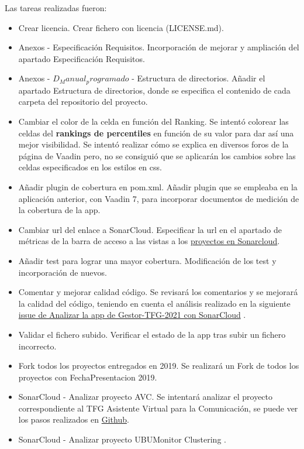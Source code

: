 Las tareas realizadas fueron:
\begin{itemize}
	\tightlist
	\item Crear licencia.
		Crear fichero con licencia (LICENSE.md).
	\item Anexos - Especificación Requisitos.
		Incorporación de mejorar y ampliación del apartado Especificación Requisitos.
	\item Anexos - $D_Manual_programado$ - Estructura de directorios.
		Añadir el apartado Estructura de directorios, donde se especifica el contenido de cada carpeta del repositorio del proyecto.
	\item Cambiar el color de la celda en función del Ranking.
		Se intentó colorear las celdas del \textbf{rankings de percentiles} en función de su valor para dar así una mejor visibilidad. Se intentó realizar cómo se explica en diversos foros de la página de Vaadin pero, no se consiguió que se aplicarán los cambios sobre las celdas especificados en los estilos en css.
	\item Añadir plugin de cobertura en pom.xml.
		Añadir plugin que se empleaba en la aplicación anterior, con Vaadin 7, para incorporar documentos de medición de la cobertura de la app.
	\item Cambiar url del enlace a SonarCloud.
		Especificar la url en el apartado de métricas de la barra de acceso a las vistas a los \href{https://sonarcloud.io/organizations/dbo1001/projects}{proyectos en Sonarcloud}.
	\item Añadir test para lograr una mayor cobertura.
		Modificación de los test y incorporación de nuevos.
	\item Comentar y mejorar calidad código.
		Se revisará los comentarios y se mejorará la calidad del código, teniendo en cuenta el análisis realizado en la siguiente \href{https://github.com/dbo1001/Gestor-TFG-2021/issues/142}{issue de Analizar la app de Gestor-TFG-2021 con SonarCloud} . 
	\item Validar el fichero subido.
		Verificar el estado de la app tras subir un fichero incorrecto.
	\item Fork todos los proyectos entregados en 2019.
		Se realizará un Fork de todos los proyectos con FechaPresentacion 2019.
	\item SonarCloud - Analizar proyecto AVC.
		Se intentará analizar el proyecto correspondiente al TFG Asistente Virtual para la Comunicación, se puede ver los pasos realizados en \href{https://github.com/dbo1001/Gestor-TFG-2021/issues/147}{Github}.
	\item SonarCloud - Analizar proyecto UBUMonitor Clustering .

\end{itemize}
